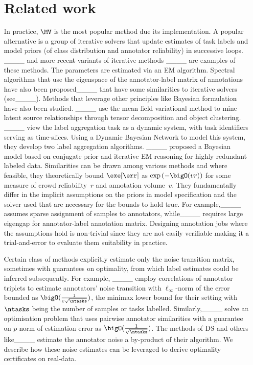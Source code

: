 \section{Related work}
\label{sec:related}
In practice, $\MV$ is the most popular method due its implementation.
A popular alternative is a group of iterative solvers that update estimates of task labels and model priors (of class distribution and annotator reliability) in successive loops.
____ and more recent variants  of iterative methods ____ are examples of these methods. The parameters are estimated via an EM algorithm. 
Spectral algorithms that use the eigenspace of the annotator-label matrix of annotations have also been proposed____ that have some similarities to iterative solvers (see____).
Methods that leverage other principles like Bayesian formulation have also been studied. ____ use the mean-field variational method to
mine latent source relationships through tensor decomposition and object clustering. 
____ view the label aggregation task as a dynamic system, with task identifiers serving as time-slices. Using a Dynamic Bayesian Network to model this system, they develop two label aggregation algorithms.
____ proposed a Bayesian model based on conjugate prior and iterative EM reasoning for highly redundant labeled data.
Similarities can be drawn among various methods and where feasible, they theoretically bound $\exe[\err]$ as $\exp{(-\bigO(vr))}$ for some measure of crowd reliability~$r$ and annotation volume~$v$.
They fundamentally differ in the implicit assumptions on the priors in model specification and the solver used that are necessary for the bounds to hold true.
For example,____ assumes sparse assignment of samples to annotators, while____ requires large eigengap for annotator-label annotation matrix.
Designing annotation jobs where the assumptions hold is non-trivial since they are not easily verifiable making it a trial-and-error to evaluate them suitability in practice.

Certain class of methods explicitly estimate only the noise transition matrix, sometimes with guarantees on optimality, from which label estimates could be inferred subsequently.
For example, ____ employ correlations of annotator triplets to estimate annotators' noise transition with $\ell_\infty$-norm of the error bounded as $\bigO(\frac{1}{v\sqrt{\ntasks}})$, the minimax lower bound for their setting with $\ntasks$ being the number of samples or tasks labelled.
Similarly,____ solve an optimisation problem that uses pairwise annotator similarities with a guarantee on $p$-norm of estimation error as $\bigO(\frac{1}{\sqrt{\ntasks}})$.
The methods of DS and others like____ estimate the annotator noise a by-product of their algorithm.
We describe how these noise estimates can be leveraged to derive optimality certificates on real-data.

